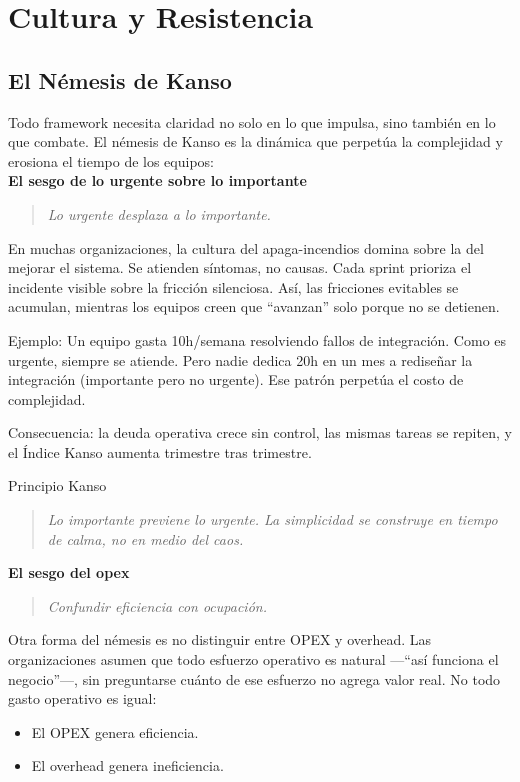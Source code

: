 \chapter{Cultura y Resistencia}\label{chap:four}

\section{El Némesis de Kanso}

Todo framework necesita claridad no solo en lo que impulsa, sino también en lo que combate. El némesis de Kanso es la dinámica que perpetúa la complejidad y erosiona el tiempo de los equipos:\\

\textbf{El sesgo de lo urgente sobre lo importante}
\begin{quote}
\textit{Lo urgente desplaza a lo importante.}
\end{quote}

En muchas organizaciones, la cultura del apaga-incendios domina sobre la del mejorar el sistema. Se atienden síntomas, no causas. Cada sprint prioriza el incidente visible sobre la fricción silenciosa. Así, las fricciones evitables se acumulan, mientras los equipos creen que ``avanzan'' solo porque no se detienen.

Ejemplo: Un equipo gasta 10h/semana resolviendo fallos de integración. Como es urgente, siempre se atiende. Pero nadie dedica 20h en un mes a rediseñar la integración (importante pero no urgente). Ese patrón perpetúa el costo de complejidad.

Consecuencia: la deuda operativa crece sin control, las mismas tareas se repiten, y el Índice Kanso aumenta trimestre tras trimestre.

Principio Kanso
\begin{quote}
\textit{Lo importante previene lo urgente. La simplicidad se construye en tiempo de calma, no en medio del caos.}
\end{quote}

\textbf{El sesgo del opex}
\begin{quote}
\textit{Confundir eficiencia con ocupación.}
\end{quote}

Otra forma del némesis es no distinguir entre OPEX y overhead. Las organizaciones asumen que todo esfuerzo operativo es natural ---``así funciona el negocio''---, sin preguntarse cuánto de ese esfuerzo no agrega valor real. No todo gasto operativo es igual:
\begin{itemize}
    \item El OPEX genera eficiencia.
    \item El overhead genera ineficiencia.
\end{itemize}

